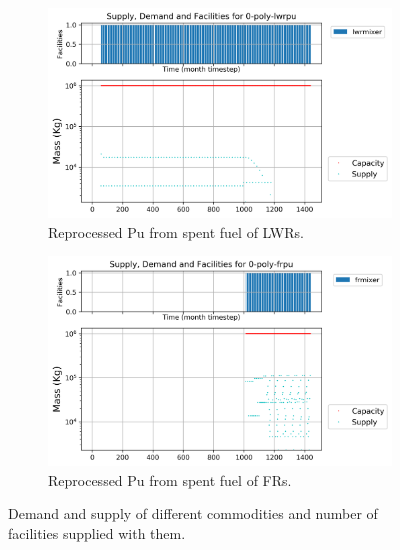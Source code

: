 \documentclass[11pt]{article}
\begin{document}
\begin{figure}[H]
	\centering
	\begin{subfigure}[t]{0.45\textwidth}
		\centering
		\includegraphics[width=\linewidth]{23-figures/0-poly-lwrpu.png} 
		\caption{Reprocessed Pu from spent fuel of LWRs.}
		\label{fig:23-lwrpu}
	\end{subfigure}
	\vspace{1cm}
	\begin{subfigure}[t]{0.45\textwidth}
		\centering
		\includegraphics[width=\linewidth]{23-figures/0-poly-frpu.png} 
		\caption{Reprocessed Pu from spent fuel of FRs.}
		\label{fig:23-frpu}
	\end{subfigure}
	\hfill
	\caption{Demand and supply of different commodities and number of facilities supplied with them.}
	\label{fig:23-pu}
\end{figure}
\end{document}
